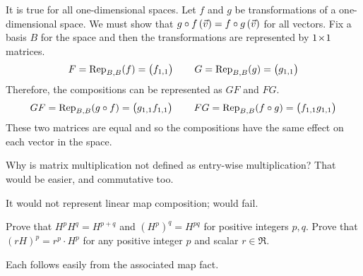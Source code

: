 \begin{exercises}
\begin{answer}
      It is true for all one-dimensional spaces.
      Let $f$ and $g$ be transformations of a one-dimensional space.
      We must show that 
      $\composed{g}{f}\,(\vec{v})=\composed{f}{g}\,(\vec{v})$
      for all vectors.
      Fix a basis $B$ for the space and then the transformations are 
      represented by $\nbyn{1}$ matrices.
      \begin{equation*}
        F=\rep{f}{B,B}=\begin{pmatrix}
                        f_{1,1}
                     \end{pmatrix}
        \qquad
        G=\rep{g}{B,B}=\begin{pmatrix}
                        g_{1,1}
                     \end{pmatrix}
      \end{equation*}
      Therefore, the compositions can be represented as $GF$ and $FG$.
      \begin{equation*}
        GF=\rep{\composed{g}{f}}{B,B}=\begin{pmatrix}
                        g_{1,1}f_{1,1}
                     \end{pmatrix}
        \qquad
        FG=\rep{\composed{f}{g}}{B,B}=\begin{pmatrix}
                        f_{1,1}g_{1,1}
                     \end{pmatrix}
      \end{equation*}
      These two matrices are equal and so the compositions have the same
      effect on each vector in the space.
     \end{answer}
  \item  
    Why is matrix multiplication not defined as entry-wise multiplication?
    That would be easier, and commutative too.
    \begin{answer}
      It would not represent linear map composition; 
       would fail.  
    \end{answer}
  \recommended \item \label{exer:NicePropsMatMult} 
    \begin{exparts}
      \partsitem Prove that $H^pH^q=H^{p+q}$ and $(H^p)^q=H^{pq}$ 
        for positive integers \( p,q \).
      \partsitem Prove that $(rH)^p=r^p\cdot H^p$ 
        for any positive integer \( p \) and scalar \( r\in\Re \).
    \end{exparts}
    \begin{answer}
      Each follows easily from the associated map fact.

\end{answer}
\end{exercises}
